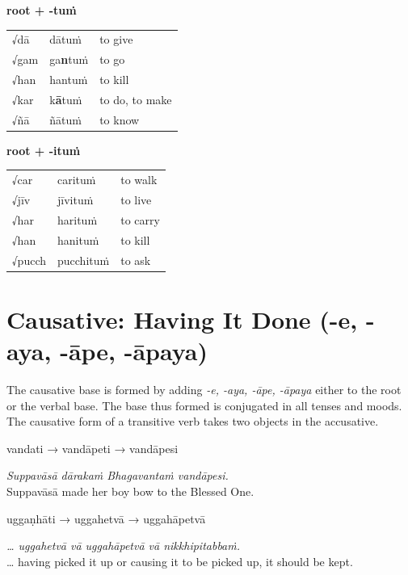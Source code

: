 \documentclass[a4paper]{memoir}
\begin{document}
{\centering
\begin{multicols}{2}

\textbf{root + -tuṁ}

\begin{center}
\begin{tabular}{lll}
√dā & dātuṁ & to give\\[0pt]
√gam & ga\textbf{n}tuṁ & to go\\[0pt]
√han & hantuṁ & to kill\\[0pt]
√kar & k\textbf{ā}tuṁ & to do, to make\\[0pt]
√ñā & ñātuṁ & to know\\[0pt]
\end{tabular}
\end{center}

\columnbreak

\textbf{root + -ituṁ}

\begin{center}
\begin{tabular}{lll}
√car & carituṁ & to walk\\[0pt]
√jīv & jīvituṁ & to live\\[0pt]
√har & harituṁ & to carry\\[0pt]
√han & hanituṁ & to kill\\[0pt]
√pucch & pucchituṁ & to ask\\[0pt]
\end{tabular}
\end{center}

\end{multicols}
\par}

\section{Causative: Having It Done (-e, -aya, -āpe, -āpaya)}
\label{sec:orgca42151}

The causative base is formed by adding \emph{-e, -aya, -āpe, -āpaya} either to the root or the verbal base.
The base thus formed is conjugated in all tenses and moods. The causative form of a transitive verb takes two objects in the accusative.

\begin{multicols}{2}

vandati → vandāpeti → vandāpesi

\emph{Suppavāsā dārakaṁ Bhagavantaṁ vandāpesi.} \\[0pt]
Suppavāsā made her boy bow to the Blessed One.

\columnbreak

uggaṇhāti → uggahetvā → uggahāpetvā

\emph{\ldots{} uggahetvā vā uggahāpetvā vā nikkhipitabbaṁ.} \\[0pt]
\ldots{} having picked it up or causing it to be picked up, it should be kept.

\end{multicols}
\end{document}
